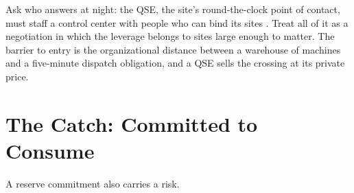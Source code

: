 Ask who answers at night: the QSE, the site's round-the-clock point of contact, must staff a control center with people who can bind its sites \autocite{ercot2026protocols}. %
Treat all of it as a negotiation in which the leverage belongs to sites large enough to matter.
The barrier to entry is the organizational distance between a warehouse of machines and a five-minute dispatch obligation, and a QSE sells the crossing at its private price.

\section{The Catch: Committed to Consume}
\label{sec:as-catch}

A reserve commitment also carries a risk.

